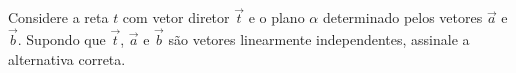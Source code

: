 \documentclass[10pt,a4paper]{article}
\begin{document}
%
{
\def\AMCbeginQuestion#1#2{\par\noindent{\bf (POSCOMP 2013 - Questão 09)}}
\begin{question}{} Considere a reta $t$ com vetor diretor $\vec t$ e o plano $\alpha$ determinado pelos vetores $\vec a$ e $\vec b$. Supondo que $\vec t$, $\vec a$ e $\vec b$ são vetores linearmente independentes, assinale a alternativa correta.
\begin{choices}
\end{choices}
\end{question}
}
%
\end{document}
